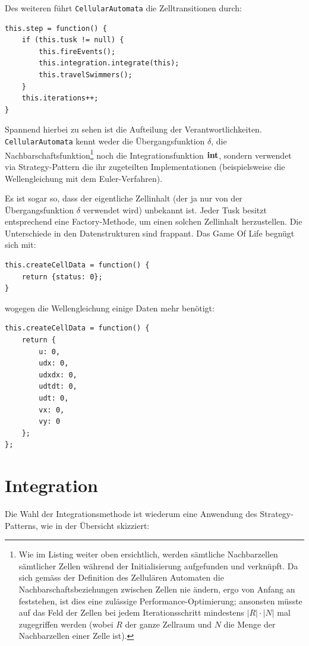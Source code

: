 \documentclass[11pt]{article} %
\theoremstyle{definition}
\begin{document}
Des weiteren führt {\tt CellularAutomata} die Zelltransitionen durch:

\begin{lstlisting}
this.step = function() {		
	if (this.tusk != null) {
		this.fireEvents();		
		this.integration.integrate(this);
		this.travelSwimmers();
	}	
	this.iterations++;	
}
\end{lstlisting}

Spannend hierbei zu sehen ist die Aufteilung der Verantwortlichkeiten. {\tt CellularAutomata} kennt weder  die Übergangsfunktion $\delta$, die Nachbarschaftsfunktion\footnote{Wie im Listing weiter oben ersichtlich, werden sämtliche Nachbarzellen sämtlicher Zellen während der Initialisierung aufgefunden und verknüpft. Da sich gemäss der Definition des Zellulären Automaten die Nachbarschaftsbeziehungen zwischen Zellen nie ändern, ergo von Anfang an feststehen, ist dies eine zulässige Performance-Optimierung; ansonsten müsste auf das Feld der Zellen bei jedem Iterationsschritt mindestens $|R|\cdot |N|$ mal zugegriffen werden (wobei $R$ der ganze Zellraum und $N$ die Menge der Nachbarzellen einer Zelle ist).} noch die Integrationsfunktion $\mathbf{int}$, sondern verwendet via Strategy-Pattern die ihr zugeteilten Implementationen (beispielsweise die Wellengleichung mit dem Euler-Verfahren).

Es ist sogar so, dass der eigentliche Zellinhalt (der ja nur von der Übergangsfunktion $\delta$ verwendet wird) unbekannt ist. Jeder Tusk besitzt entsprechend eine Factory-Methode, um einen solchen Zellinhalt herzustellen. Die Unterschiede in den Datenstrukturen sind frappant. Das Game Of Life begnügt sich mit:

\begin{lstlisting}
this.createCellData = function() {
	return {status: 0};
}
\end{lstlisting}

wogegen die Wellengleichung einige Daten mehr benötigt:
\begin{lstlisting}
this.createCellData = function() {
	return {
		u: 0,
		udx: 0,
		udxdx: 0,
		udtdt: 0,
		udt: 0,
		vx: 0,
		vy: 0
	};
};
\end{lstlisting}

\section{Integration}

Die Wahl der Integrationsmethode ist wiederum eine Anwendung des Strategy-Patterns, wie in der Übersicht skizziert:
\end{document}
